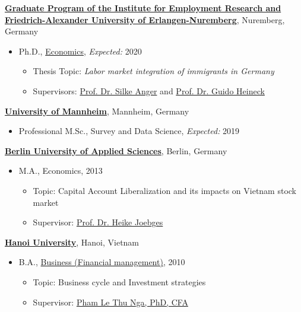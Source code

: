 \documentclass[10pt]{article}
\newenvironment{outerlist}[1][\enskip\textbullet]%
        {\begin{itemize}[#1,leftmargin=*]}{\end{itemize}%
         \vspace{-.6\baselineskip}}
\newenvironment{innerlist}[1][\enskip\textbullet]%
        {\begin{itemize}[#1,leftmargin=*,parsep=0pt,itemsep=0pt,topsep=0pt,partopsep=0pt]}
        {\end{itemize}}
\begin{document}
\href{http://www.iab.de/en/ueberblick/graduiertenprogramm.aspx}{\textbf{Graduate Program of the Institute for Employment Research and Friedrich-Alexander University of Erlangen-Nuremberg}},
Nuremberg, Germany
\begin{outerlist}

\item[] Ph.D.,
        \href{http://www.iab.de/en/ueberblick/graduiertenprogramm/promovieren.aspx}
             {Economics},
             \emph{Expected:}  2020
        \begin{innerlist}
        \item Thesis Topic: \emph{Labor market integration of immigrants in Germany}
        \item Supervisors:
              \href{http://www.iab.de/754/section.aspx/Mitarbeiter/4859330}
                   {Prof. Dr. Silke Anger} and
              \href{https://www.uni-bamberg.de/vwl-mikro/team/heineck/}
                   {Prof. Dr. Guido Heineck}
        \end{innerlist}
\end{outerlist}

\vspace{.1in}
\href{https://survey-data-science.net/}{\textbf{University of Mannheim}},
Mannheim, Germany
\begin{outerlist}
\item[] Professional M.Sc., {Survey and Data Science},
		\emph{Expected:} 2019
\end{outerlist}

\vspace{.1in}
\href{http://mide.htw-berlin.de/}{\textbf{Berlin University of Applied Sciences}},
Berlin, Germany
\begin{outerlist}
\item[] M.A., {Economics}, 2013
        \begin{innerlist}
        \item Topic: Capital Account Liberalization and its impacts on Vietnam stock market
        \item Supervisor:
              \href{https://www.htw-berlin.de/hochschule/personen/person/?eid=4647}
                    {Prof. Dr. Heike Joebges}
        \end{innerlist}
\end{outerlist}

\vspace{.1in}
\href{http://internationaloffice.hanu.vn/}{\textbf{Hanoi University}},
Hanoi, Vietnam
\begin{outerlist}
\item[] B.A.,
        \href{http://fmt.hanu.vn/en/mod/page/view.php?id=13}
             {Business (Financial management)}, 2010
        \begin{innerlist}
        \item Topic: Business cycle and Investment strategies
        \item Supervisor:
              \href{https://www.linkedin.com/in/pham-le-thu-nga-cfa-180a2b11/}
                   {Pham Le Thu Nga, PhD, CFA}
        \end{innerlist}
\end{outerlist}
\end{document}

